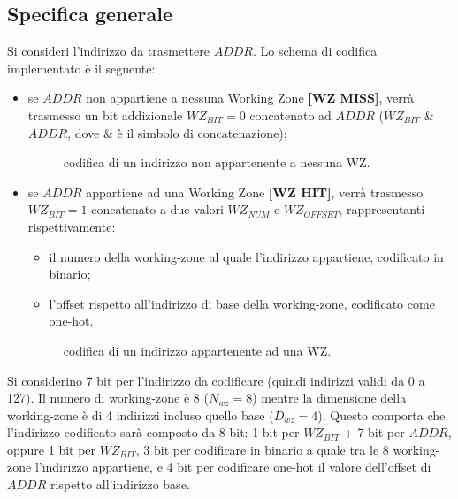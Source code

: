 \subsection{Specifica generale}
Si consideri l'indirizzo da trasmettere $ADDR$. Lo schema di codifica implementato è il seguente:
\begin{itemize}
	\item se $ADDR$ non appartiene a nessuna Working Zone \textbf{[WZ MISS]}, verrà trasmesso un bit addizionale ${WZ}_{BIT}=0$ concatenato ad $ADDR$ (${WZ}_{BIT}$ \& $ADDR$, dove \& è il simbolo di concatenazione);
	
		\begin{figure}[!htb]
			
			\caption{codifica di un indirizzo non appartenente a nessuna WZ.}
			\label{fig:addr_no_wz}
		\end{figure}

	\item se $ADDR$ appartiene ad una Working Zone \textbf{[WZ HIT]}, verrà trasmesso ${WZ}_{BIT}=1$ concatenato a due valori ${WZ}_{NUM}$ e ${WZ}_{OFFSET}$, rappresentanti rispettivamente:
	\begin{itemize}
		\item il numero della working-zone al quale l'indirizzo appartiene, codificato in binario;
		
		\item l'offset rispetto all'indirizzo di base della working-zone, codificato come one-hot.
	\end{itemize}

	
	
	\begin{figure}[!htb]
			
		\caption{codifica di un indirizzo appartenente ad una WZ.}
		\label{fig:addr_in_wz}
	\end{figure}
\end{itemize}

Si considerino 7 bit per l'indirizzo da codificare (quindi indirizzi validi da 0 a 127).\newline
Il numero di working-zone è 8 ($N_{wz}=8$) mentre la dimensione della working-zone è di 4 indirizzi incluso quello base ($D_{wz}=4$). Questo comporta che l'indirizzo codificato sarà composto da 8 bit: 1 bit per ${WZ}_{BIT}$ + 7 bit per $ADDR$, oppure 1 bit per ${WZ}_{BIT}$, 3 bit per codificare in binario a quale tra le 8 working-zone l'indirizzo appartiene, e 4 bit per codificare one-hot il valore dell'offset di $ADDR$ rispetto all'indirizzo base.\newline

